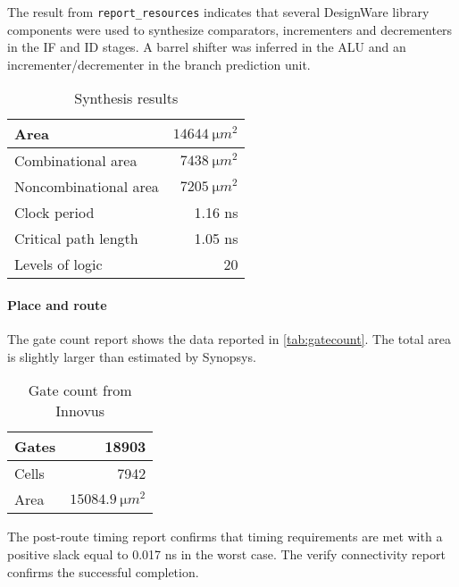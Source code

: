 The result from \texttt{report\_resources} indicates that several DesignWare library components were used to synthesize comparators, incrementers and decrementers in the IF and ID stages. A barrel shifter was inferred in the ALU and an incrementer/decrementer in the branch prediction unit.

\begin{table}[htbp]
	\centering
	\begin{tabular}{|l|r|}
		\hline
		Area & $\SI{14644}{\micro m^2}$\\\hline
		Combinational area & $\SI{7438}{\micro m^2}$\\\hline
		Noncombinational area & $\SI{7205}{\micro m^2}$\\\hline
		Clock period & 1.16 ns \\\hline
		Critical path length & 1.05 ns\\\hline
		Levels of logic & 20 \\\hline

	\end{tabular}
\caption{Synthesis results}
\label{tab:synres}
\end{table}

\paragraph{Place and route} The gate count report shows the data reported in \autoref{tab:gatecount}. The total area is slightly larger than estimated by Synopsys.
\begin{table}[htbp]
	\centering
	\begin{tabular}{|l|r|}\hline
  Gates &     18903\\\hline Cells &   7942\\\hline Area &   $\SI{15084.9}{\micro m^2}$\\\hline
	\end{tabular}
	\caption{Gate count from Innovus}
	\label{tab:gatecount}
\end{table}

The post-route timing report confirms that timing requirements are met with a positive slack equal to 0.017 ns in the worst case. The verify connectivity report confirms the successful completion.

